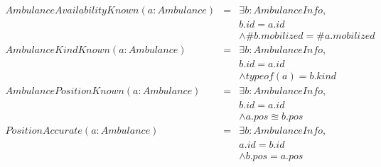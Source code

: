 	\singlespacing
	\begin{equation*}
		\begin{array}{rcl}
		AmbulanceAvailabilityKnown(a: Ambulance)
		& = & \exists b: AmbulanceInfo, \\
		&   & b.id = a.id \\
		&   & \wedge \#b.mobilized = \#a.mobilized \\

		AmbulanceKindKnown(a: Ambulance)
		& = & \exists b: AmbulanceInfo, \\
		&   & b.id = a.id \\
		&   & \wedge typeof(a) = b.kind \\

		AmbulancePositionKnown(a:Ambulance)
		& = & \exists b:AmbulanceInfo, \\
		&   & b.id = a.id \\
		&   & \wedge a.pos \approxeq b.pos \\
		
		PositionAccurate(a:Ambulance)
		& = & \exists b:AmbulanceInfo, \\
		&   & a.id = b.id \\
		&   & \wedge b.pos = a.pos \\
		\end{array}
	\end{equation*}
	\onehalfspacing


